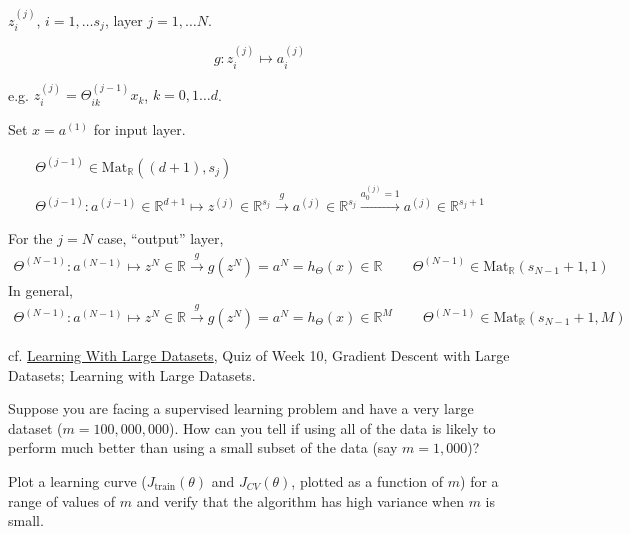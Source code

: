 \documentclass[10pt]{amsart}
\begin{document}
\begin{multicols*}{2}
$z_i^{(j)}$, $i=1, \dots s_j$, layer $j=1, \dots N$.

\begin{equation}
  g: z_i^{(j)} \mapsto a_i^{(j)}
  \end{equation}

e.g. $z_i^{(j)} = \Theta_{ik}^{(j-1)} x_k$, $k=0,1\dots d$.

Set $x=a^{(1)}$ for input layer.

\begin{equation}
  \begin{gathered}
    \Theta^{(j-1)} \in \text{Mat}_{\mathbb{R}}( (d+1), s_j) \\
    \Theta^{(j-1)} : a^{(j-1)} \in \mathbb{R}^{d+1} \mapsto z^{(j)} \in \mathbb{R}^{s_j} \xrightarrow{ g} a^{(j)} \in \mathbb{R}^{s_j} \xrightarrow{ a_0^{(j)} = 1 } a^{(j)} \in \mathbb{R}^{s_j + 1}
    \end{gathered}
  \end{equation}

For the $j=N$ case, ``output'' layer,
\begin{equation}
\begin{gathered}
  \Theta^{(N-1)} : a^{(N-1)} \mapsto z^N \in \mathbb{R} \xrightarrow{ g} g(z^N) = a^N = h_{\Theta}(x) \in \mathbb{R} \qquad \, \Theta^{(N-1)} \in \text{Mat}_{\mathbb{R}}( s_{N-1} +1, 1)
  \end{gathered}
  \end{equation}
In general,
\[
\begin{gathered}
  \Theta^{(N-1)} : a^{(N-1)} \mapsto z^N \in \mathbb{R} \xrightarrow{ g} g(z^N) = a^N = h_{\Theta}(x) \in \mathbb{R}^M \qquad \, \Theta^{(N-1)} \in \text{Mat}_{\mathbb{R}}( s_{N-1} +1, M)
\end{gathered}
\]



cf. \href{https://www.coursera.org/learn/machine-learning/lecture/CipHf/learning-with-large-datasets}{Learning With Large Datasets}, Quiz of Week 10, Gradient Descent with Large Datasets; Learning with Large Datasets.

Suppose you are facing a supervised learning problem and have a very large dataset ($m=100,000,000$).  How can you tell if using all of the data is likely to perform much better than using a small subset of the data (say $m=1,000$)?

Plot a learning curve ($J_{\text{train}}(\theta)$ and $J_{CV}(\theta)$, plotted as a function of $m$) for a range of values of $m$ and verify that the algorithm has high variance when $m$ is small.  



\end{multicols*}
\end{document}
